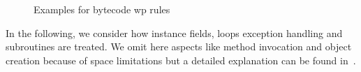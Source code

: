 \begin{figure}[t]

\caption{\sc Examples for bytecode wp rules}
 \label{instrWP}

\end{figure}

In the following, we consider how instance fields, %
loops exception handling and subroutines are treated. We omit here aspects like method invocation and object creation because of space limitations but a detailed explanation can be found in~\cite{JBL05MP}. 

%





